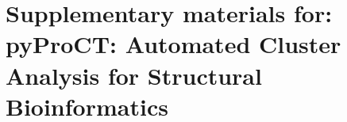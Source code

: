 \section[Supplementary materials: pyProCT]{Supplementary materials for: pyProCT: Automated Cluster Analysis for Structural Bioinformatics}






